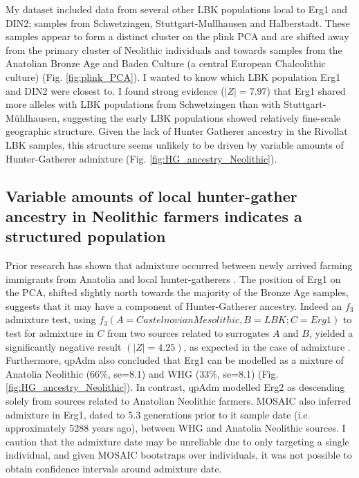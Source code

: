 My dataset included data from several other LBK populations local to Erg1 and DIN2; samples from Schwetzingen, Stuttgart-Mullhausen and Halberstadt. These samples appear to form a distinct cluster on the plink PCA and are shifted away from the primary cluster of Neolithic individuals and towards samples from the Anatolian Bronze Age and Baden Culture (a central European Chalcolithic culture) (Fig. \ref{fig:plink_PCA}). I wanted to know which LBK population Erg1 and DIN2 were closest to. I found strong evidence ($|Z| = 7.97$) that Erg1 shared more alleles with LBK populations from Schwetzingen than with Stuttgart-Mühlhausen, suggesting the early LBK populations showed relatively fine-scale geographic structure. Given the lack of Hunter Gatherer ancestry in the Rivollat LBK samples, this structure seems unlikely to be driven by variable amounts of Hunter-Gatherer admixture (Fig. \ref{fig:HG_ancestry_Neolithic}).


\subsection{Variable amounts of local hunter-gather ancestry in Neolithic farmers indicates a structured population}

Prior research has shown that admixture occurred between newly arrived farming immigrants from Anatolia and local hunter-gatherers \cite{Gamba2014, Haak2015, mathieson2018genomic, gonzalez2017paleogenomic, Lipson2017b}. The position of Erg1 on the PCA, shifted slightly north towards the majority of the Bronze Age samples, suggests that it may have a component of Hunter-Gatherer ancestry. Indeed an $f_{3}$ admixture test, using $f_{3}(A=Castelnovian Mesolithic, B=LBK; C=Erg1)$ to test for admixture in $C$ from two sources related to surrogates $A$ and $B$, yielded a significantly negative result $(|Z|=4.25)$, as expected in the case of admixture \cite{Patterson2012}. Furthermore, qpAdm also concluded that Erg1 can be modelled as a mixture of Anatolia Neolithic (66\%, se=8.1) and WHG (33\%, se=8.1) (Fig. \ref{fig:HG_ancestry_Neolithic}). In contrast, qpAdm modelled Erg2 as descending solely from sources related to Anatolian Neolithic farmers.  MOSAIC also inferred admixture in Erg1, dated to 5.3 generations prior to it sample date (i.e. approximately 5288 years ago), between WHG and Anatolia Neolithic sources. I caution that the admixture date may be unreliable due to only targeting a single individual, and given MOSAIC bootstraps over individuals, it was not possible to obtain confidence intervals around admixture date. 

